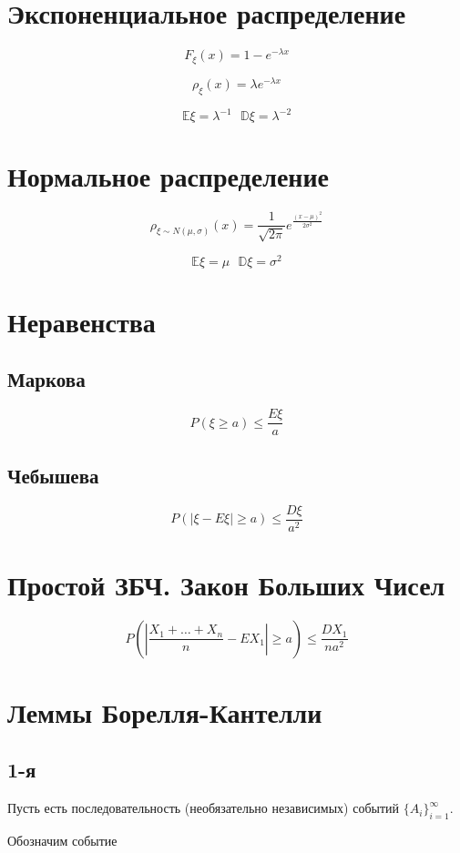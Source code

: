 \documentclass[a4paper, 14pt]{extarticle}
\begin{document}
\section{Экспоненциальное распределение}

$$F_{\xi}(x) = 1 - e^{-\lambda x}$$

$$\rho_{\xi}(x) = \lambda e^{-\lambda x}$$

$$\mathbb{E}\xi = \lambda^{-1}~~~\mathbb{D}\xi = \lambda^{-2}$$

\section{Нормальное распределение}

$$\rho_{\xi \sim N(\mu, \sigma)}(x) = \frac{1}{\sqrt{2\pi}}e^{\frac{(x-\mu)^2}{2\sigma^2}}$$

$$\mathbb{E}\xi = \mu~~~\mathbb{D}\xi = \sigma^2$$

\section{Неравенства}
\subsection{Маркова}
$$P(\xi \geq a) \leq \frac{E\xi}{a}$$

\subsection{Чебышева}
$$P(|\xi - E\xi| \geq a) \leq \frac{D\xi}{a^2}$$

\section{Простой ЗБЧ. Закон Больших Чисел}
$$P\left(\left|\frac{X_1 + \ldots + X_n}{n} - EX_1\right| \geq a\right) \leq \frac{DX_1}{na^2}$$

\section{Леммы Борелля-Кантелли}
\subsection{1-я}

Пусть есть последовательность (необязательно независимых) событий $\{A_i\}_{i=1}^{\infty}$.

Обозначим событие
\end{document}
